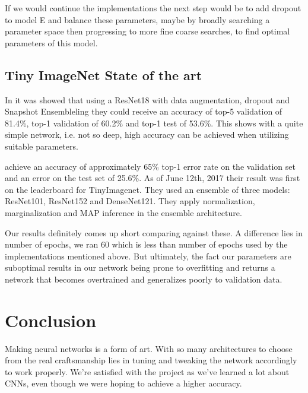 \documentclass{kthreport}
\begin{document}
If we would continue the implementations the next step would be to add dropout to model E and balance these parameters, maybe by broadly searching a parameter space then progressing to more fine coarse searches, to find optimal parameters of this model.


\subsection{Tiny ImageNet State of the art}

In \cite{BarnesStanford} it was showed that using a ResNet18 with data augmentation, dropout and Snapshot Ensembleling they could receive an accuracy of top-5 validation of 81.4\%, top-1 validation of 60.2\% and top-1 test of 53.6\%. This shows with a quite simple network, i.e. not so deep, high accuracy can be achieved when utilizing suitable parameters.

\cite{vCheung} achieve an accuracy of approximately 65\% top-1 error rate on the validation set and an error on the test set of 25.6\%. As of June 12th, 2017 their result was first on the leaderboard for TinyImagenet. They used an ensemble of three models: ResNet101, ResNet152 and DenseNet121. They apply normalization, marginalization and MAP inference in the ensemble architecture.

Our results definitely comes up short comparing against these. A difference lies in number of epochs, we ran 60 which is less than number of epochs used by the implementations mentioned above. But ultimately, the fact our parameters are suboptimal results in our network being prone to overfitting and returns a network that becomes overtrained and generalizes poorly to validation data.

\section{Conclusion}
Making neural networks is a form of art. With so many architectures to choose from the real craftsmanship lies in tuning and tweaking the network accordingly to work properly. We're satisfied with the project as we've learned a lot about CNNs, even though we were hoping to achieve a higher accuracy.


{}

\end{document}

